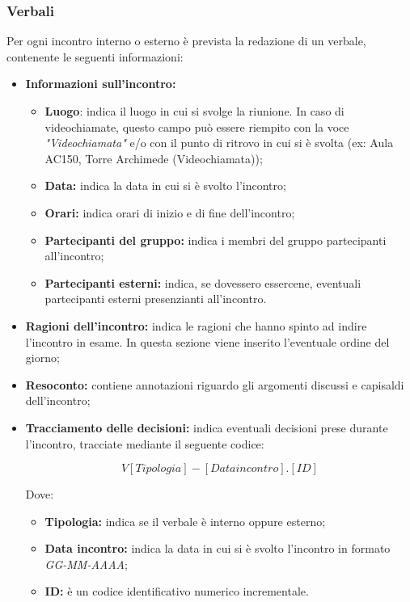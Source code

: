\documentclass[../NormediProgetto.tex]{subfiles}
\begin{document}
\subsubsection{Verbali}

Per ogni incontro interno o esterno è prevista la redazione di un verbale, contenente le seguenti informazioni:
\begin{itemize}
    \item \textbf{Informazioni sull'incontro:}
    \begin{itemize}
        \item \textbf{Luogo}: indica il luogo in cui si svolge la riunione. In caso di videochiamate, questo campo può essere riempito con la voce \textit{"Videochiamata"} e/o con il punto di ritrovo in cui si è svolta (ex: Aula AC150, Torre Archimede (Videochiamata));
        \item \textbf{Data:} indica la data in cui si è svolto l'incontro;
        \item \textbf{Orari:} indica orari di inizio e di fine dell'incontro;
        \item \textbf{Partecipanti del gruppo:} indica i membri del gruppo partecipanti all'incontro;
        \item \textbf{Partecipanti esterni:} indica, se dovessero essercene, eventuali partecipanti esterni presenzianti all'incontro.
    \end{itemize}
    
    \item \textbf{Ragioni dell'incontro:} indica le ragioni che hanno spinto ad indire l'incontro in esame. In questa sezione viene inserito l'eventuale ordine del giorno;
    
    \item \textbf{Resoconto:} contiene annotazioni riguardo gli argomenti discussi e capisaldi dell'incontro;
    
    \item \textbf{Tracciamento delle decisioni:} indica eventuali decisioni prese durante l'incontro, tracciate mediante il seguente codice:
    
        \[V[Tipologia]-[Data incontro].[ID]\]
    
    Dove:
    
    \begin{itemize}
        \item \textbf{Tipologia:} indica se il verbale è interno oppure esterno;
        \item \textbf{Data incontro:} indica la data in cui si è svolto l'incontro in formato \textit{GG-MM-AAAA};
        \item \textbf{ID:} è un codice identificativo numerico incrementale.
    \end{itemize}
    
\end{itemize}
\end{document}
